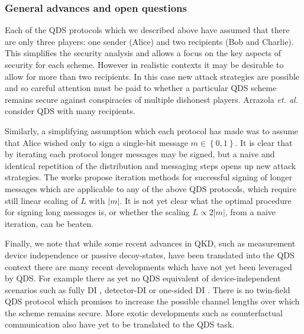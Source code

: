 \subsubsection*{General advances and open questions}
Each of the QDS protocols which we described above have assumed that there are only three players: one sender (Alice) and two recipients (Bob and Charlie). This simplifies the security analysis and allows a focus on the key aspects of security for each scheme. However in realistic contexts it may be desirable to allow for more than two recipients. In this case new attack strategies are possible and so careful attention must be paid to whether a particular QDS scheme remains secure against conspiracies of multiple dishonest players. Arrazola \emph{et. al.} \cite{Arrazola2015} consider QDS with many recipients. %

Similarly, a simplifying assumption which each protocol has made was to assume that Alice wished only to sign a single-bit message $m \in \left\{0, 1\right\}$. It is clear that by iterating each protocol longer messages may be signed, but a naive and identical repetition of the distribution and messaging steps opens up new attack strategies. The works \cite{Wang2015, Wang2017} propose iteration methods for successful signing of longer messages which are applicable to any of the above QDS protocols, which require still linear scaling of $L$ with $\left|m\right|$. It is not yet clear what the optimal procedure for signing long messages is, or whether the scaling $L \propto 2 \left|m\right|$, from a naive iteration, can be beaten. %

Finally, we note that while some recent advances in QKD, such as measurement device independence or passive decoy-states, have been translated into the QDS context there are many recent developments which have not yet been leveraged by QDS. For example there as yet no QDS equivalent of device-independent scenarios such as fully DI \cite{Vazirani2014}, detector-DI \cite{Lim2014a} or one-sided DI \cite{Walk2016a}. There is no twin-field \cite{Curty2018} QDS protocol which promises to increase the possible channel lengths over which the scheme remains secure. More exotic developments such as counterfactual communication \cite{Noh2009, Salih2013a, Hance2019, Vaidman2019} also have yet to be translated to the QDS task. 

